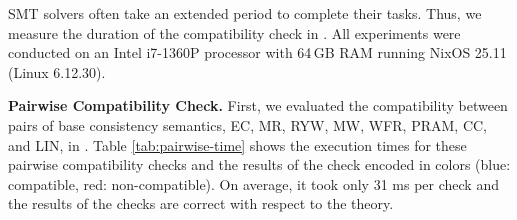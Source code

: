 SMT solvers often take an extended period to complete their tasks.
Thus, we measure the
duration of the compatibility check in \sysname{}.
All experiments were conducted on an Intel i7-1360P processor with
64\,GB RAM running NixOS 25.11 (Linux 6.12.30).


\textbf{Pairwise Compatibility Check.}
%
First, we evaluated the compatibility between pairs of base
consistency semantics,
EC, MR, RYW, MW, WFR, PRAM, CC, and LIN, in \sysname{}.
Table \ref{tab:pairwise-time} shows the execution times for these
pairwise compatibility checks and the results of the check encoded in
colors (blue: compatible, red: non-compatible). On average, it took
only 31 ms per check and the results of the checks are correct with
respect to the theory.



